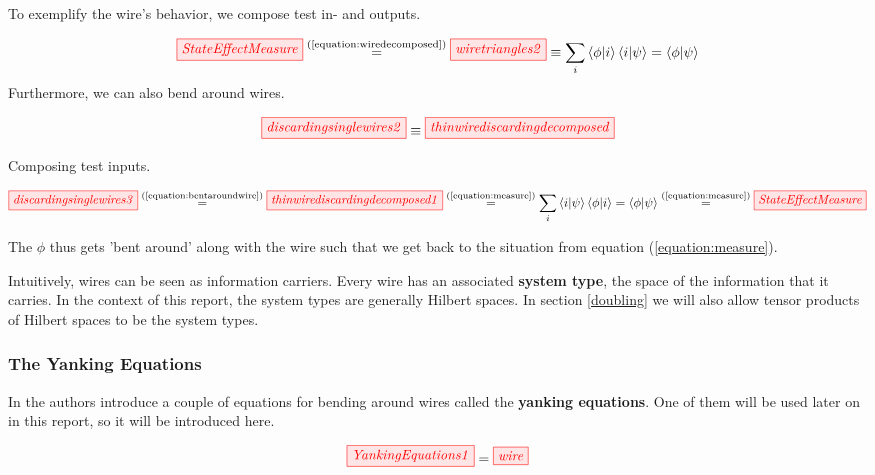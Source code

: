 \documentclass[]{article}
\newcommand{\equaltext}[1]{\ensuremath{\stackrel{\text{#1}}{=}}}
\begin{document}
To exemplify the wire's behavior, we compose test in- and outputs.

\begin{equation}
\label{equation:measure}
\tikzfig{StateEffectMeasure} \equaltext{(\ref{equation:wiredecomposed})}  \tikzfig{wiretriangles2} \equiv \sum_{i}\bra{\phi}\ket{i}\bra{i}\ket{\psi} = \bra{\phi}\ket{\psi}
\end{equation}
\newpage
Furthermore, we can also bend around wires.

\begin{equation}
\label{equation:bentaroundwire}
\tikzfig{discardingsinglewires2} \equiv
\tikzfig{thinwirediscardingdecomposed} 
\end{equation}

Composing test inputs.

\begin{equation}
\label{equation:bentaroundwiresinandoutputs}
\tikzfig{discardingsinglewires3} \equaltext{(\ref{equation:bentaroundwire})} \tikzfig{thinwirediscardingdecomposed1} \equaltext{(\ref{equation:measure})} \sum_{i}\bra{i}\ket{\psi}\bra{\phi}\ket{i} = \bra{\phi}\ket{\psi} \equaltext{(\ref{equation:measure})} \tikzfig{StateEffectMeasure}
\end{equation}

The $\phi$ thus gets 'bent around' along with the wire such that we get back to the situation from equation (\ref{equation:measure}). 

Intuitively, wires can be seen as information carriers. Every wire has an associated \textbf{system type}, the space of the information that it carries. In the context of this report, the system types are generally Hilbert spaces. In section \ref{doubling} we will also allow tensor products of Hilbert spaces to be the system types.

\subsubsection{The Yanking Equations}
\label{section:yankingequations}

In \cite{Coecke2017} the authors introduce a couple of equations for bending around wires called the \textbf{yanking equations}. One of them will be used later on in this report, so it will be introduced here.

\begin{equation}
\label{equation:yankingequation}
\tikzfig{YankingEquations1} = \tikzfig{wire}
\end{equation}
\end{document}
